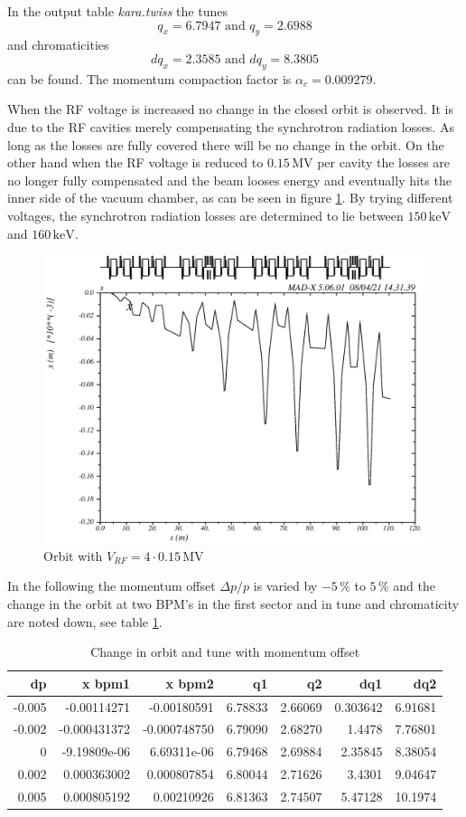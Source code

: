 In the output table \textit{kara.twiss} the tunes
$$q_x=6.7947\text{ and }q_y=2.6988$$
and chromaticities
$$dq_x=2.3585\text{ and }dq_y=8.3805$$
can be found.
The momentum compaction factor is $\alpha_c=0.009279$.
\par
When the RF voltage is increased no change in the closed orbit is observed. It is due to the RF cavities merely compensating the synchrotron radiation losses. As long as the losses are fully covered there will be no change in the orbit.
On the other hand when the RF voltage is reduced to $0.15\,\mathrm{MV}$ per cavity the losses are no longer fully compensated and the beam looses energy and eventually hits the inner side of the vacuum chamber, as can be seen in figure \ref{fig:vrf150kV}.
By trying different voltages, the synchrotron radiation losses are determined to lie between $150\,\mathrm{keV}$ and $160\,\mathrm{keV}$.
\begin{figure}[tbp]
    \centering
    \includegraphics[width=0.8\linewidth]{../../part3/vrf150kV.png}
    \caption{Orbit with $V_{RF}=4\cdot0.15\,\mathrm{MV}$}
    \label{fig:vrf150kV}
\end{figure}
\par
In the following the momentum offset $\Delta p/p$ is varied by $-5\,\%$ to $5\,\%$ and the change in the orbit at two BPM's in the first sector and in tune and chromaticity are noted down, see table \ref{tab:3c}.
\begin{table}[tbp]
    \centering
    \small
    \begin{tabular}{r|r r r r r r}
dp&x bpm1&x bpm2&q1&q2&dq1&dq2\\\hline
-0.005&-0.00114271&-0.00180591&6.78833&2.66069&0.303642&6.91681\\
-0.002&-0.000431372&-0.000748750&6.79090&2.68270&1.4478&7.76801\\
0&-9.19809e-06&6.69311e-06&6.79468& 2.69884&2.35845&8.38054\\
0.002&0.000363002&0.000807854&6.80044&2.71626&3.4301&9.04647\\
0.005&0.000805192&0.00210926&6.81363&2.74507&5.47128&10.1974
    \end{tabular}
    \caption{Change in orbit and tune with momentum offset}
    \label{tab:3c}
\end{table}
